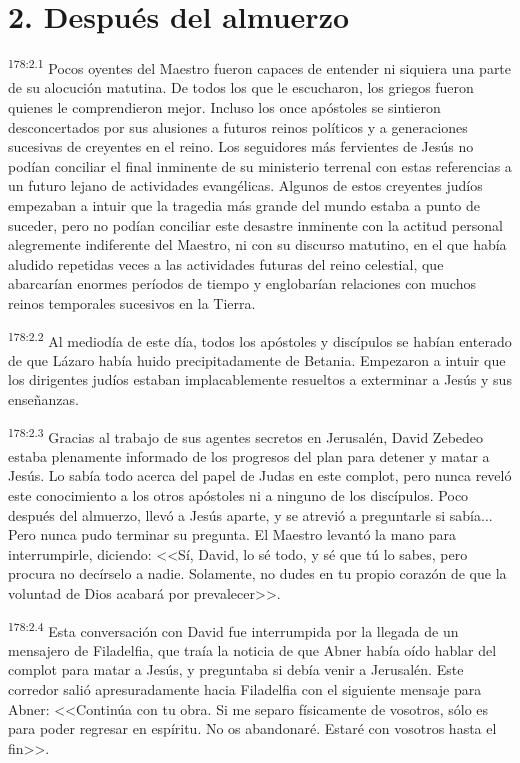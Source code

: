 \section*{2. Después del almuerzo}
\par 
\textsuperscript{178:2.1} Pocos oyentes del Maestro fueron capaces de entender ni siquiera una parte de su alocución matutina. De todos los que le escucharon, los griegos fueron quienes le comprendieron mejor. Incluso los once apóstoles se sintieron desconcertados por sus alusiones a futuros reinos políticos y a generaciones sucesivas de creyentes en el reino. Los seguidores más fervientes de Jesús no podían conciliar el final inminente de su ministerio terrenal con estas referencias a un futuro lejano de actividades evangélicas. Algunos de estos creyentes judíos empezaban a intuir que la tragedia más grande del mundo estaba a punto de suceder, pero no podían conciliar este desastre inminente con la actitud personal alegremente indiferente del Maestro, ni con su discurso matutino, en el que había aludido repetidas veces a las actividades futuras del reino celestial, que abarcarían enormes períodos de tiempo y englobarían relaciones con muchos reinos temporales sucesivos en la Tierra.

\par 
\textsuperscript{178:2.2} Al mediodía de este día, todos los apóstoles y discípulos se habían enterado de que Lázaro había huido precipitadamente de Betania. Empezaron a intuir que los dirigentes judíos estaban implacablemente resueltos a exterminar a Jesús y sus enseñanzas.

\par 
\textsuperscript{178:2.3} Gracias al trabajo de sus agentes secretos en Jerusalén, David Zebedeo estaba plenamente informado de los progresos del plan para detener y matar a Jesús. Lo sabía todo acerca del papel de Judas en este complot, pero nunca reveló este conocimiento a los otros apóstoles ni a ninguno de los discípulos. Poco después del almuerzo, llevó a Jesús aparte, y se atrevió a preguntarle si sabía... Pero nunca pudo terminar su pregunta. El Maestro levantó la mano para interrumpirle, diciendo: <<Sí, David, lo sé todo, y sé que tú lo sabes, pero procura no decírselo a nadie. Solamente, no dudes en tu propio corazón de que la voluntad de Dios acabará por prevalecer>>.

\par 
\textsuperscript{178:2.4} Esta conversación con David fue interrumpida por la llegada de un mensajero de Filadelfia, que traía la noticia de que Abner había oído hablar del complot para matar a Jesús, y preguntaba si debía venir a Jerusalén. Este corredor salió apresuradamente hacia Filadelfia con el siguiente mensaje para Abner: <<Continúa con tu obra. Si me separo físicamente de vosotros, sólo es para poder regresar en espíritu. No os abandonaré. Estaré con vosotros hasta el fin>>.

